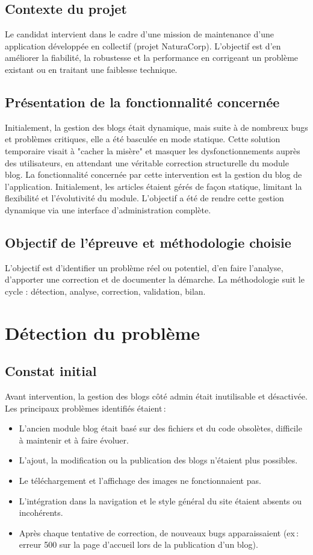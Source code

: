 \documentclass[a4paper,12pt]{report}
\begin{document}
\subsection{Contexte du projet}
Le candidat intervient dans le cadre d’une mission de maintenance d’une application développée en collectif (projet NaturaCorp). L’objectif est d’en améliorer la fiabilité, la robustesse et la performance en corrigeant un problème existant ou en traitant une faiblesse technique.

\subsection{Présentation de la fonctionnalité concernée}
Initialement, la gestion des blogs était dynamique, mais suite à de nombreux bugs et problèmes critiques, elle a été basculée en mode statique. Cette solution temporaire visait à "cacher la misère" et masquer les dysfonctionnements auprès des utilisateurs, en attendant une véritable correction structurelle du module blog.
La fonctionnalité concernée par cette intervention est la gestion du blog de l’application. Initialement, les articles étaient gérés de façon statique, limitant la flexibilité et l’évolutivité du module. L’objectif a été de rendre cette gestion dynamique via une interface d’administration complète.

\subsection{Objectif de l’épreuve et méthodologie choisie}
L’objectif est d’identifier un problème réel ou potentiel, d’en faire l’analyse, d’apporter une correction et de documenter la démarche. La méthodologie suit le cycle : détection, analyse, correction, validation, bilan.

\section{Détection du problème}
\subsection{Constat initial}
Avant intervention, la gestion des blogs côté admin était inutilisable et désactivée. Les principaux problèmes identifiés étaient :
\begin{itemize}
    \item L’ancien module blog était basé sur des fichiers et du code obsolètes, difficile à maintenir et à faire évoluer.
    \item L’ajout, la modification ou la publication des blogs n’étaient plus possibles.
    \item Le téléchargement et l’affichage des images ne fonctionnaient pas.
    \item L’intégration dans la navigation et le style général du site étaient absents ou incohérents.
    \item Après chaque tentative de correction, de nouveaux bugs apparaissaient (ex : erreur 500 sur la page d’accueil lors de la publication d’un blog).
\end{itemize}
\end{document}
